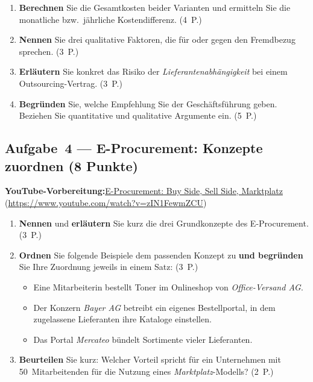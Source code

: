 \documentclass[11pt, a4paper]{article}
\begin{document}
\begin{enumerate}[label=(\alph*)]
  \item \textbf{Berechnen} Sie die Gesamtkosten beider Varianten und ermitteln Sie die monatliche bzw.\ jährliche Kostendifferenz. \hfill (4~P.)
  \item \textbf{Nennen} Sie drei qualitative Faktoren, die für oder gegen den Fremdbezug sprechen. \hfill (3~P.)
  \item \textbf{Erläutern} Sie konkret das Risiko der \emph{Lieferantenabhängigkeit} bei einem Outsourcing-Vertrag. \hfill (3~P.)
  \item \textbf{Begründen} Sie, welche Empfehlung Sie der Geschäftsführung geben. Beziehen Sie quantitative und qualitative Argumente ein. \hfill (5~P.)
\end{enumerate}

\subsection*{Aufgabe~4 --- E-Procurement: Konzepte zuordnen (8 Punkte)}

\noindent\textbf{\color{bfwAccent}YouTube-Vorbereitung:}\enspace \href{https://www.youtube.com/watch?v=zIN1FewmZCU}{E-Procurement: Buy Side, Sell Side, Marktplatz} (\url{https://www.youtube.com/watch?v=zIN1FewmZCU})

\medskip
\begin{enumerate}[label=(\alph*)]
  \item \textbf{Nennen} und \textbf{erläutern} Sie kurz die drei Grundkonzepte des E-Procurement. \hfill (3~P.)
  \item \textbf{Ordnen} Sie folgende Beispiele dem passenden Konzept zu \textbf{und begründen} Sie Ihre Zuordnung jeweils in einem Satz: \hfill (3~P.)
    \begin{itemize}[leftmargin=*]
      \item Eine Mitarbeiterin bestellt Toner im Onlineshop von \emph{Office-Versand AG}.
      \item Der Konzern \emph{Bayer AG} betreibt ein eigenes Bestellportal, in dem zugelassene Lieferanten ihre Kataloge einstellen.
      \item Das Portal \emph{Mercateo} bündelt Sortimente vieler Lieferanten.
    \end{itemize}
  \item \textbf{Beurteilen} Sie kurz: Welcher Vorteil spricht für ein Unternehmen mit 50~Mitarbeitenden für die Nutzung eines \emph{Marktplatz}-Modells? \hfill (2~P.)
\end{enumerate}
\end{document}
